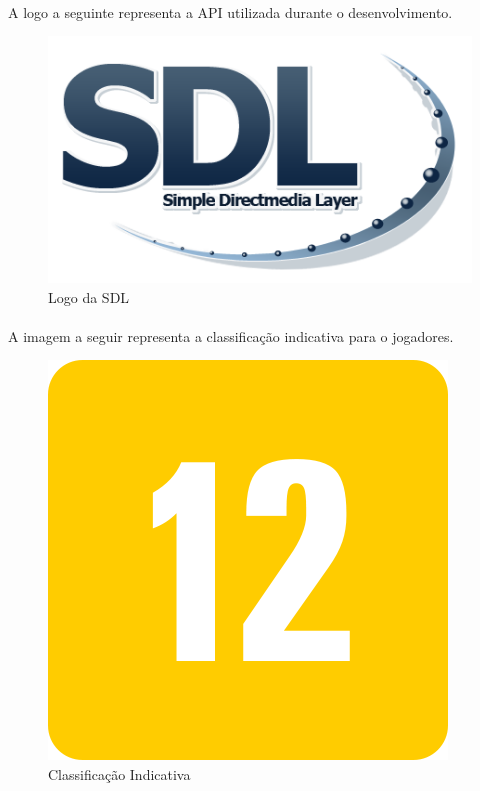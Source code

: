 \documentclass[11pt]{article} %
\begin{document}
\paragraph{} A logo a seguinte representa a API utilizada durante o desenvolvimento.

\begin{figure}[!htp]
\centering
\includegraphics[scale=0.6]{res/Sdl-logo.png}
\caption{Logo da SDL}
\label{Logo da SDL}
\end{figure}

\paragraph{} A imagem a seguir representa a classificação indicativa para o jogadores.

\newpage

\begin{figure}[!htp]
\centering
\includegraphics[scale=0.5]{res/classification.png}
\caption{Classificação Indicativa}
\label{Classificação Indicativa}
\end{figure}
\end{document}

